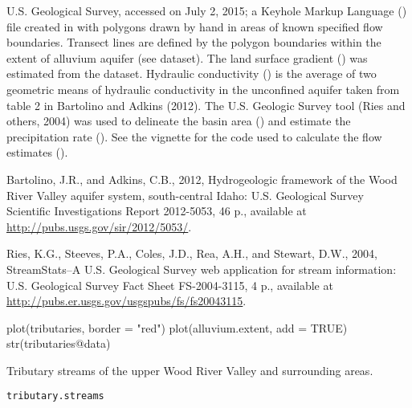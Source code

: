 \documentclass[letterpaper]{book}
\begin{document}
%
\begin{Source}\relax
U.S. Geological Survey, accessed on July 2, 2015;
a Keyhole Markup Language () file created in  with polygons drawn by hand in areas of known specified flow boundaries.
Transect lines are defined by the polygon boundaries within the extent of alluvium aquifer (see  dataset).
The land surface gradient () was estimated from the  dataset.
Hydraulic conductivity () is the average of two geometric means of hydraulic conductivity in the unconfined aquifer taken from table 2 in Bartolino and Adkins (2012).
The U.S. Geologic Survey  tool (Ries and others, 2004) was used to delineate the basin area () and estimate the precipitation rate ().
See the  vignette for the \R{} code used to calculate the flow estimates ().
\end{Source}
%
\begin{References}\relax
Bartolino, J.R., and Adkins, C.B., 2012, Hydrogeologic framework of the Wood River Valley aquifer system, south-central Idaho: U.S. Geological Survey Scientific Investigations Report 2012-5053, 46 p., available at \url{http://pubs.usgs.gov/sir/2012/5053/}.

Ries, K.G., Steeves, P.A., Coles, J.D., Rea, A.H., and Stewart, D.W., 2004, StreamStats--A U.S. Geological Survey web application for stream information: U.S. Geological Survey Fact Sheet FS-2004-3115, 4 p., available at \url{http://pubs.er.usgs.gov/usgspubs/fs/fs20043115}.
\end{References}
%
\begin{Examples}
\begin{ExampleCode}
plot(tributaries, border = "red")
plot(alluvium.extent, add = TRUE)
str(tributaries@data)
\end{ExampleCode}
\end{Examples}
%
\begin{Description}\relax
Tributary streams of the upper Wood River Valley and surrounding areas.
\end{Description}
%
\begin{Usage}
\begin{verbatim}
tributary.streams
\end{verbatim}
\end{Usage}
\end{document}
